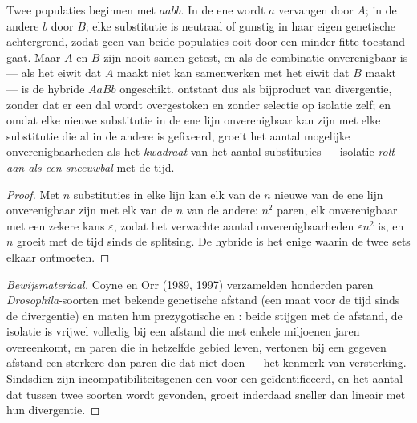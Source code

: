 \begin{theorem}\label{thm:b2:speciation:dm}
Twee populaties beginnen met  $aabb$. In de ene wordt $a$ vervangen
door $A$; in de andere $b$ door $B$; elke substitutie is neutraal of
gunstig in haar eigen genetische achtergrond, zodat geen van beide populaties
ooit door een minder fitte toestand gaat. Maar $A$ en $B$ zijn nooit samen
getest, en als de combinatie onverenigbaar is --- als het eiwit dat $A$ maakt
niet kan samenwerken met het eiwit dat $B$ maakt --- is de
hybride $AaBb$ ongeschikt.  ontstaat dus als
bijproduct van divergentie, zonder dat er een dal wordt overgestoken en zonder
selectie op isolatie zelf; en omdat elke nieuwe substitutie in de ene lijn
onverenigbaar kan zijn met elke substitutie die al in de andere is gefixeerd,
groeit het aantal mogelijke onverenigbaarheden als het
\emph{kwadraat} van het aantal substituties --- isolatie
\emph{rolt aan als een sneeuwbal} met de tijd.
\end{theorem}
\begin{proof}
Met $n$ substituties in elke lijn kan elk van de $n$ nieuwe 
van de ene lijn onverenigbaar zijn met elk van de $n$ van de
andere: $n^{2}$ paren, elk onverenigbaar met een zekere kans
$\varepsilon$, zodat het verwachte aantal onverenigbaarheden
$\varepsilon n^{2}$ is, en $n$ groeit met de tijd sinds de splitsing.
De hybride is het enige  waarin de twee sets elkaar ontmoeten.
\end{proof}
\begin{proof}[Bewijsmateriaal]
Coyne en Orr (1989, 1997) verzamelden honderden paren
\emph{Drosophila}-soorten met bekende genetische afstand (een maat voor de
tijd sinds de divergentie) en maten hun prezygotische en : beide stijgen met de afstand, de isolatie is vrijwel volledig bij
een afstand die met enkele miljoenen jaren overeenkomt, en paren die in
hetzelfde gebied leven, vertonen bij een gegeven afstand een sterkere
 dan paren die dat niet doen --- het kenmerk van
versterking. Sindsdien zijn incompatibiliteitsgenen een voor een
geïdentificeerd, en het aantal dat tussen twee soorten wordt gevonden, groeit
inderdaad sneller dan lineair met hun divergentie.
\end{proof}


